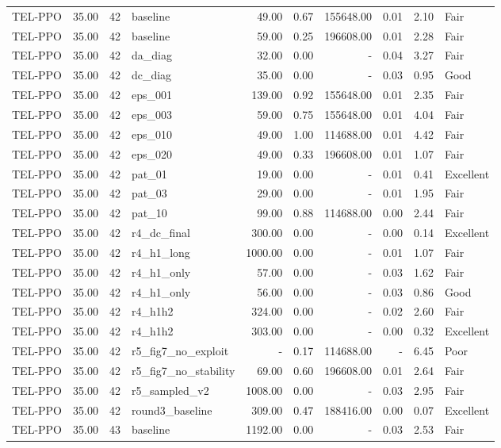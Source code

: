 \begin{table}[htbp]
\begin{tabular}{lrrlrrrrrl}
TEL-PPO & 35.00 & 42 & baseline & 49.00 & 0.67 & 155648.00 & 0.01 & 2.10 & Fair \\
TEL-PPO & 35.00 & 42 & baseline & 59.00 & 0.25 & 196608.00 & 0.01 & 2.28 & Fair \\
TEL-PPO & 35.00 & 42 & da_diag & 32.00 & 0.00 & - & 0.04 & 3.27 & Fair \\
TEL-PPO & 35.00 & 42 & dc_diag & 35.00 & 0.00 & - & 0.03 & 0.95 & Good \\
TEL-PPO & 35.00 & 42 & eps_001 & 139.00 & 0.92 & 155648.00 & 0.01 & 2.35 & Fair \\
TEL-PPO & 35.00 & 42 & eps_003 & 59.00 & 0.75 & 155648.00 & 0.01 & 4.04 & Fair \\
TEL-PPO & 35.00 & 42 & eps_010 & 49.00 & 1.00 & 114688.00 & 0.01 & 4.42 & Fair \\
TEL-PPO & 35.00 & 42 & eps_020 & 49.00 & 0.33 & 196608.00 & 0.01 & 1.07 & Fair \\
TEL-PPO & 35.00 & 42 & pat_01 & 19.00 & 0.00 & - & 0.01 & 0.41 & Excellent \\
TEL-PPO & 35.00 & 42 & pat_03 & 29.00 & 0.00 & - & 0.01 & 1.95 & Fair \\
TEL-PPO & 35.00 & 42 & pat_10 & 99.00 & 0.88 & 114688.00 & 0.00 & 2.44 & Fair \\
TEL-PPO & 35.00 & 42 & r4_dc_final & 300.00 & 0.00 & - & 0.00 & 0.14 & Excellent \\
TEL-PPO & 35.00 & 42 & r4_h1_long & 1000.00 & 0.00 & - & 0.01 & 1.07 & Fair \\
TEL-PPO & 35.00 & 42 & r4_h1_only & 57.00 & 0.00 & - & 0.03 & 1.62 & Fair \\
TEL-PPO & 35.00 & 42 & r4_h1_only & 56.00 & 0.00 & - & 0.03 & 0.86 & Good \\
TEL-PPO & 35.00 & 42 & r4_h1h2 & 324.00 & 0.00 & - & 0.02 & 2.60 & Fair \\
TEL-PPO & 35.00 & 42 & r4_h1h2 & 303.00 & 0.00 & - & 0.00 & 0.32 & Excellent \\
TEL-PPO & 35.00 & 42 & r5_fig7_no_exploit & - & 0.17 & 114688.00 & - & 6.45 & Poor \\
TEL-PPO & 35.00 & 42 & r5_fig7_no_stability & 69.00 & 0.60 & 196608.00 & 0.01 & 2.64 & Fair \\
TEL-PPO & 35.00 & 42 & r5_sampled_v2 & 1008.00 & 0.00 & - & 0.03 & 2.95 & Fair \\
TEL-PPO & 35.00 & 42 & round3_baseline & 309.00 & 0.47 & 188416.00 & 0.00 & 0.07 & Excellent \\
TEL-PPO & 35.00 & 43 & baseline & 1192.00 & 0.00 & - & 0.03 & 2.53 & Fair \\

\end{tabular}
\end{table}
